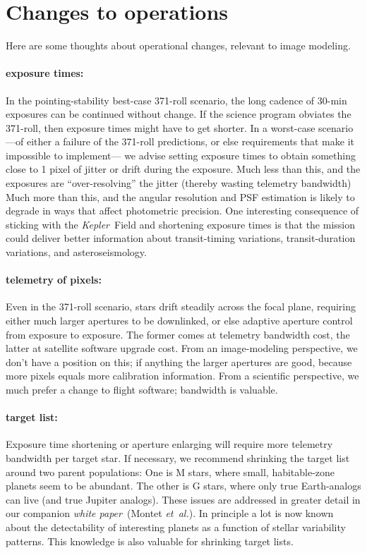\documentclass[letterpaper,12pt,whitepaper]{haastex}
\newcommand{\documentname}{\textsl{white paper}}
\newcommand{\foreign}[1]{\textit{#1}}
\newcommand{\etal}{\foreign{et~al.}}
\newcommand{\observatory}[1]{\textsl{#1}}
\newcommand{\Kepler}{\observatory{Kepler}}
\newcounter{address}
\begin{document}


\section{Changes to operations}\label{sec:operations}

Here are some thoughts about operational changes, relevant to image
modeling.

\paragraph{exposure times:}
In the pointing-stability best-case 371-roll scenario,
  the long cadence of 30-min exposures can be continued without change.
If the science program obviates the 371-roll,
  then exposure times might have to get shorter.
In a worst-case scenario%
  ---of either a failure of the 371-roll predictions,
  or else requirements that make it impossible to implement---%
  we advise setting exposure times to obtain something close to 1 pixel
  of jitter or drift during the exposure.
Much less than this, and the exposures are ``over-resolving'' the jitter
  (thereby wasting telemetry bandwidth)
Much more than this, and the angular resolution and PSF estimation is
  likely to degrade in ways that affect photometric precision.
One interesting consequence of sticking with the \Kepler~Field and shortening
  exposure times is that the mission could deliver better information
  about transit-timing variations, transit-duration variations, and asteroseismology.

\paragraph{telemetry of pixels:}
Even in the 371-roll scenario, stars drift steadily across the focal plane,
  requiring either much larger apertures to be downlinked,
  or else adaptive aperture control from exposure to exposure.
The former comes at telemetry bandwidth cost,
  the latter at satellite software upgrade cost.
From an image-modeling perspective, we don't have a position on this;
  if anything the larger apertures are good,
  because more pixels equals more calibration information.
From a scientific perspective, we much prefer a change to flight software;
  bandwidth is valuable.

\paragraph{target list:}
Exposure time shortening or aperture enlarging will require more telemetry bandwidth per target star.
If necessary, we recommend shrinking the target list around two parent populations:
One is M stars, where small, habitable-zone planets seem to be abundant.
The other is G stars, where only true Earth-analogs can live (and true Jupiter analogs).
These issues are addressed in greater detail in our companion \documentname\ (Montet \etal).
In principle a lot is now known about the detectability of interesting planets
  as a function of stellar variability patterns.
This knowledge is also valuable for shrinking target lists.
\end{document}
